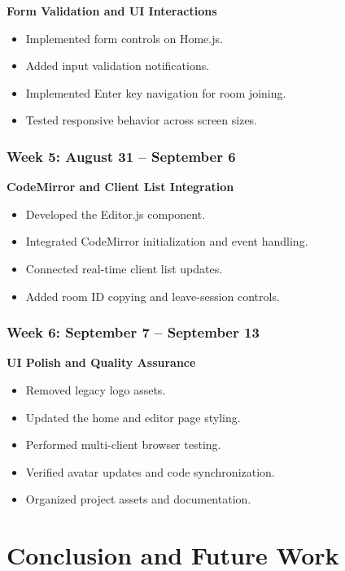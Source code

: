 \documentclass[12pt,a4paper,oneside]{report}
\begin{document}
\textbf{Form Validation and UI Interactions}

\begin{itemize}
    \item Implemented form controls on Home.js.
    \item Added input validation notifications.
    \item Implemented Enter key navigation for room joining.
    \item Tested responsive behavior across screen sizes.
\end{itemize}

\subsection*{Week 5: August 31 -- September 6}

\textbf{CodeMirror and Client List Integration}

\begin{itemize}
    \item Developed the Editor.js component.
    \item Integrated CodeMirror initialization and event handling.
    \item Connected real-time client list updates.
    \item Added room ID copying and leave-session controls.
\end{itemize}

\subsection*{Week 6: September 7 -- September 13}

\textbf{UI Polish and Quality Assurance}

\begin{itemize}
    \item Removed legacy logo assets.
    \item Updated the home and editor page styling.
    \item Performed multi-client browser testing.
    \item Verified avatar updates and code synchronization.
    \item Organized project assets and documentation.
\end{itemize}

\chapter{Conclusion and Future Work}
\end{document}
